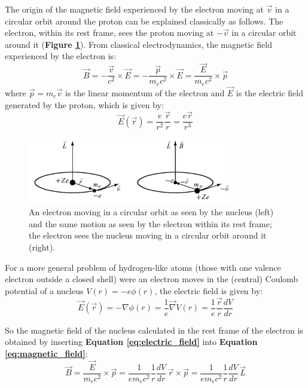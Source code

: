 The origin of the magnetic field experienced by the electron moving at $\vec{v}$ in a circular orbit around the proton can be explained classically as follows. The electron, within its rest frame, sees the proton moving at $-\vec{v}$ in a circular orbit around it (\textbf{Figure \ref{fig:spin_orbit_coupling}}). From classical electrodynamics, the magnetic field experienced by the electron is:
\begin{equation} \label{eq:magnetic_field}
    \vec{B} = -\frac{\vec{v}}{c^2}\times \vec{E} = -\frac{\vec{p}}{m_ec^2}\times \vec{E} = \frac{\vec{E}}{m_ec^2}\times \vec{p}
\end{equation}
where $\vec{p} = m_e\vec{v}$ is the linear momentum of the electron and $\vec{E}$ is the electric field generated by the proton, which is given by:
\begin{equation}
    \vec{E}(\vec{r}) = \frac{e}{r^2}\frac{\vec{r}}{r} = \frac{e\vec{r}}{r^3}
\end{equation}

\begin{figure}[htbp]
    \centering
    \includegraphics[width=0.8\textwidth]{images/spin-orbit-coupling.png}
    \caption{An electron moving in a circular orbit as seen by the nucleus (left) and the same motion as seen by the electron within its rest frame; the electron sees the nucleus moving in a circular orbit around it (right).}
    \label{fig:spin_orbit_coupling}
\end{figure}

For a more general problem of hydrogen-like atoms (those with one valence electron outside a closed shell) were an electron moves in the (central) Coulomb potential of a nucleus $V(r) = -e\phi(r)$, the electric field is given by:
\begin{equation} \label{eq:electric_field}
    \vec{E}(\vec{r}) = -\nabla\phi(r) = \frac{1}{e}\vec{\nabla} V(r) = \frac{1}{e}\frac{\vec{r}}{r}\frac{dV}{dr}
\end{equation}

So the magnetic field of the nucleus calculated in the rest frame of the electron is obtained by inserting \textbf{Equation \ref{eq:electric_field}} into \textbf{Equation \ref{eq:magnetic_field}}:
\begin{equation}
    \vec{B} = \frac{\vec{E}}{m_ec^2}\times \vec{p} = \frac{1}{em_ec^2}\frac{1}{r}\frac{dV}{dr}\,\vec{r}\times \vec{p} = \frac{1}{em_ec^2}\frac{1}{r}\frac{dV}{dr}\,\vec{L}
\end{equation}

